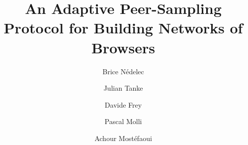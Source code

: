 \documentclass[acmlarge]{acmart}
\begin{document}
\title{An Adaptive Peer-Sampling Protocol for Building Networks of Browsers}

\newcommand{\affLSNN}{L2SN, University of Nantes\\
  2 rue de la Houssini{\`e}re\\
  BP 92208, 44322 Nantes Cedex 3, France\\
  \url{first.last@univ-nantes.fr}}

\newcommand{\affINRIA}{INRIA Bretagne-Atlantique\\
  Campus Universitaire de Beaulieu \\
  35042 Rennes Cedex, France\\
  \url{davide.frey@inria.fr}}



\author{Brice N{\'e}delec}
\author{Julian Tanke}
\author{Davide Frey}
\author{Pascal Molli}
\author{Achour Most{\'e}faoui}






\maketitle
%


%
%
% 
% 
% 
% 
% 

\clearpage


\clearpage
  
\end{document}
